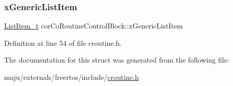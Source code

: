 \subsubsection{\texorpdfstring{x\+Generic\+List\+Item}{xGenericListItem}}
{\footnotesize\ttfamily \hyperlink{externals_2freertos_2include_2list_8h_a1a62d469392f9bfe2443e7efab9c8398}{List\+Item\+\_\+t} cor\+Co\+Routine\+Control\+Block\+::x\+Generic\+List\+Item}



Definition at line 54 of file croutine.\+h.



The documentation for this struct was generated from the following file\+:\begin{DoxyCompactItemize}
\item 
muju/externals/freertos/include/\hyperlink{externals_2freertos_2include_2croutine_8h}{croutine.\+h}\end{DoxyCompactItemize}
